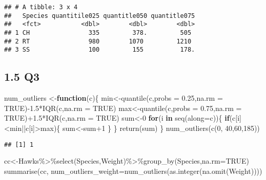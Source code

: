 \documentclass[
]{article}
\newenvironment{Shaded}{\begin{snugshade}}{\end{snugshade}}
\newcommand{\AttributeTok}[1]{\textcolor[rgb]{0.77,0.63,0.00}{#1}}
\newcommand{\ConstantTok}[1]{\textcolor[rgb]{0.00,0.00,0.00}{#1}}
\newcommand{\ControlFlowTok}[1]{\textcolor[rgb]{0.13,0.29,0.53}{\textbf{#1}}}
\newcommand{\DecValTok}[1]{\textcolor[rgb]{0.00,0.00,0.81}{#1}}
\newcommand{\FloatTok}[1]{\textcolor[rgb]{0.00,0.00,0.81}{#1}}
\newcommand{\FunctionTok}[1]{\textcolor[rgb]{0.00,0.00,0.00}{#1}}
\newcommand{\NormalTok}[1]{#1}
\newcommand{\OtherTok}[1]{\textcolor[rgb]{0.56,0.35,0.01}{#1}}
\newcommand{\SpecialCharTok}[1]{\textcolor[rgb]{0.00,0.00,0.00}{#1}}
\begin{document}
\begin{verbatim}
## # A tibble: 3 x 4
##   Species quantitile025 quantitle050 quantitle075
##   <fct>           <dbl>        <dbl>        <dbl>
## 1 CH                335         378.         505 
## 2 RT                980        1070         1210 
## 3 SS                100         155          178.
\end{verbatim}

\hypertarget{q3}{%
\subsection{1.5 Q3}\label{q3}}

\begin{Shaded}
\begin{Highlighting}[]
\NormalTok{num\_outliers }\OtherTok{\textless{}{-}}\ControlFlowTok{function}\NormalTok{(c)\{}
\NormalTok{  min}\OtherTok{\textless{}{-}}\FunctionTok{quantile}\NormalTok{(c,}\AttributeTok{probs =} \FloatTok{0.25}\NormalTok{,}\AttributeTok{na.rm =} \ConstantTok{TRUE}\NormalTok{)}\SpecialCharTok{{-}}\FloatTok{1.5}\SpecialCharTok{*}\FunctionTok{IQR}\NormalTok{(c,}\AttributeTok{na.rm =} \ConstantTok{TRUE}\NormalTok{)}
\NormalTok{  max}\OtherTok{\textless{}{-}}\FunctionTok{quantile}\NormalTok{(c,}\AttributeTok{probs =} \FloatTok{0.75}\NormalTok{,}\AttributeTok{na.rm =} \ConstantTok{TRUE}\NormalTok{)}\SpecialCharTok{+}\FloatTok{1.5}\SpecialCharTok{*}\FunctionTok{IQR}\NormalTok{(c,}\AttributeTok{na.rm =} \ConstantTok{TRUE}\NormalTok{)}
\NormalTok{  sum}\OtherTok{\textless{}{-}}\DecValTok{0}
  \ControlFlowTok{for}\NormalTok{(i }\ControlFlowTok{in} \FunctionTok{seq}\NormalTok{(}\AttributeTok{along=}\NormalTok{c))\{}
    \ControlFlowTok{if}\NormalTok{(c[i]}\SpecialCharTok{\textless{}}\NormalTok{min}\SpecialCharTok{||}\NormalTok{c[i]}\SpecialCharTok{\textgreater{}}\NormalTok{max)\{}
\NormalTok{      sum}\OtherTok{\textless{}{-}}\NormalTok{sum}\SpecialCharTok{+}\DecValTok{1}
\NormalTok{    \}}
\NormalTok{  \}}
  \FunctionTok{return}\NormalTok{(sum)}
\NormalTok{\}}
\FunctionTok{num\_outliers}\NormalTok{(}\FunctionTok{c}\NormalTok{(}\DecValTok{0}\NormalTok{, }\DecValTok{40}\NormalTok{,}\DecValTok{60}\NormalTok{,}\DecValTok{185}\NormalTok{))}
\end{Highlighting}
\end{Shaded}

\begin{verbatim}
## [1] 1
\end{verbatim}

\begin{Shaded}
\begin{Highlighting}[]
\NormalTok{cc}\OtherTok{\textless{}{-}}\NormalTok{Hawks}\SpecialCharTok{\%\textgreater{}\%}\FunctionTok{select}\NormalTok{(Species,Weight)}\SpecialCharTok{\%\textgreater{}\%}\FunctionTok{group\_by}\NormalTok{(Species,}\AttributeTok{na.rm=}\ConstantTok{TRUE}\NormalTok{)}
\FunctionTok{summarise}\NormalTok{(cc, }\AttributeTok{num\_outliers\_weight=}\FunctionTok{num\_outliers}\NormalTok{(}\FunctionTok{as.integer}\NormalTok{(}\FunctionTok{na.omit}\NormalTok{(Weight))))}
\end{Highlighting}
\end{Shaded}
\end{document}

